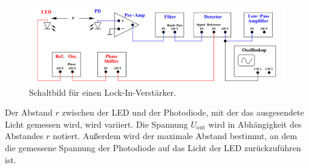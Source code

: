 \begin{figure}
    \centering
    \includegraphics[width=\textwidth/2]{images/bild4.png}
    \caption{Schaltbild für einen Lock-In-Verstärker.\cite{V303}}
    \label{fig:bild4}
\end{figure}

Der Abstand $r$ zwischen der LED und der Photodiode, mit der das ausgesendete Licht gemessen wird, wird variiert.
Die Spannung $U_\text{out}$ wird in Abhängigkeit des Abstandes $r$ notiert.
Außerdem wird der maximale Abstand bestimmt, an dem die gemessene Spannung der Photodiode auf das Licht der LED zurückzuführen ist.